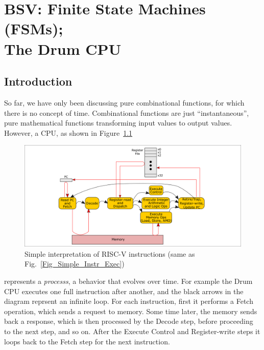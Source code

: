 

\chapter{BSV: Finite State Machines (FSMs); \\
The Drum CPU}


\setcounter{page}{1}
\renewcommand{\thepage}{\arabic{chapter}-\arabic{page}}

\label{ch_FSMs}


\section{Introduction}

So far, we have only been discussing pure combinational functions, for
which there is no concept of time.  Combinational functions are just
``instantaneous'', pure mathematical functions transforming input
values to output values.  However, a CPU, as shown in
Figure~\ref{Fig_FSMs_Simple_Instr_Exec}
\begin{figure}[htbp]
  \centerline{\includegraphics[width=6in,angle=0]{ch030_RISCV_Design_Space/Figures/Fig_Simple_Instr_Exec}}
  \caption{\label{Fig_FSMs_Simple_Instr_Exec}Simple interpretation of RISC-V instructions (same as Fig.~\ref{Fig_Simple_Instr_Exec})}
\end{figure}
represents a \emph{processs}, a behavior that evolves over time.  For
example the Drum CPU executes one full instruction after another,
and the black arrows in the diagram reprsent an infinite loop. For
each instruction, first it performs a Fetch operation, which sends a
request to memory. Some time later, the memory sends back a response,
which is then processed by the Decode step, before proceeding to the
next step, and so on.  After the Execute Control and Register-write
steps it loops back to the Fetch step for the next instruction.


